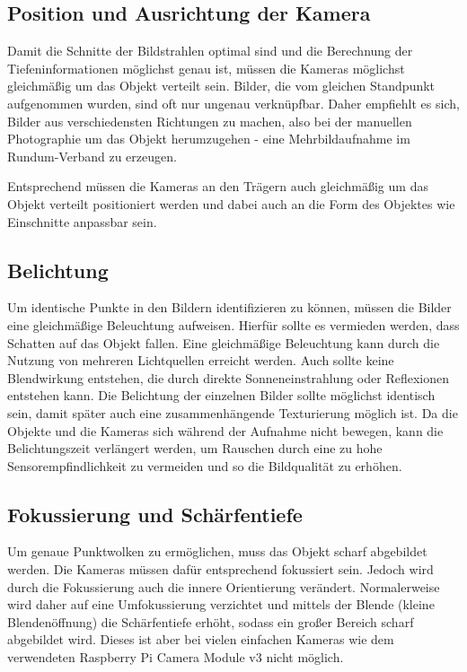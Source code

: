 \documentclass[./00PhotoBox.tex]{subfiles}
\begin{document}
\subsection{Position und Ausrichtung der Kamera}
Damit die Schnitte der Bildstrahlen optimal sind und die Berechnung der Tiefeninformationen möglichst genau ist, müssen die Kameras möglichst gleichmäßig um das Objekt verteilt sein.
Bilder, die vom gleichen Standpunkt aufgenommen wurden, sind oft nur ungenau verknüpfbar. Daher empfiehlt es sich, Bilder aus verschiedensten Richtungen zu machen, also bei der manuellen Photographie um das Objekt herumzugehen - eine Mehrbildaufnahme im Rundum-Verband zu erzeugen. \citep[S. 170]{luhmann}

Entsprechend müssen die Kameras an den Trägern auch gleichmäßig um das Objekt verteilt positioniert werden und dabei auch an die Form des Objektes wie Einschnitte anpassbar sein.

\subsection{Belichtung}
Um identische Punkte in den Bildern identifizieren zu können, müssen die Bilder eine gleichmäßige Beleuchtung aufweisen. Hierfür sollte es vermieden werden, dass Schatten auf das Objekt fallen. Eine gleichmäßige Beleuchtung kann durch die Nutzung von mehreren Lichtquellen erreicht werden. Auch sollte keine Blendwirkung entstehen, die durch direkte Sonneneinstrahlung oder Reflexionen entstehen kann. Die Belichtung der einzelnen Bilder sollte möglichst identisch sein, damit später auch eine zusammenhängende Texturierung möglich ist.
Da die Objekte und die Kameras sich während der Aufnahme nicht bewegen, kann die Belichtungszeit verlängert werden, um Rauschen durch eine zu hohe Sensorempfindlichkeit zu vermeiden und so die Bildqualität zu erhöhen.


\subsection{Fokussierung und Schärfentiefe}
\label{s:schaerfe}
Um genaue Punktwolken zu ermöglichen, muss das Objekt scharf abgebildet werden. Die Kameras müssen dafür entsprechend fokussiert sein. Jedoch wird durch die Fokussierung auch die innere Orientierung verändert. Normalerweise wird daher auf eine Umfokussierung verzichtet und mittels der Blende (kleine Blendenöffnung) die Schärfentiefe erhöht, sodass ein großer Bereich scharf abgebildet wird. Dieses ist aber bei vielen einfachen Kameras wie dem verwendeten Raspberry Pi Camera Module v3 nicht möglich.
\end{document}
